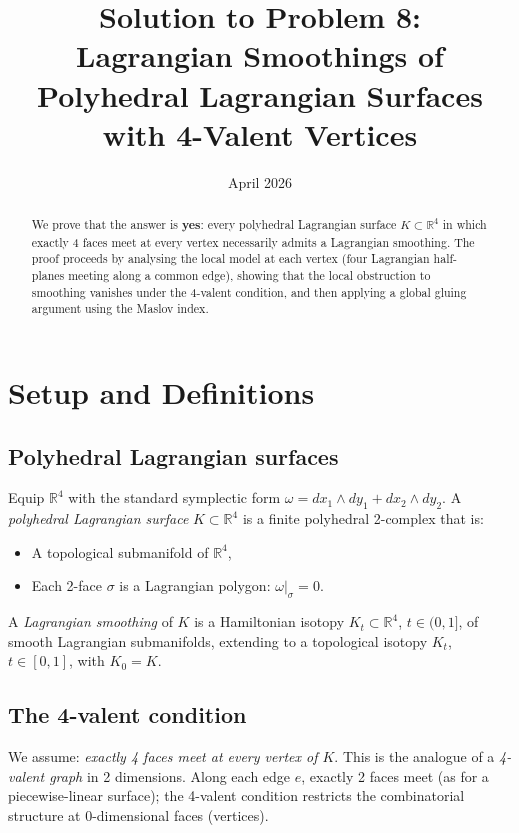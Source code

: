 \documentclass[12pt]{article}
\title{Solution to Problem 8:\\
Lagrangian Smoothings of Polyhedral Lagrangian Surfaces\\
with 4-Valent Vertices}
\author{}
\date{April 2026}
\theoremstyle{definition}
\theoremstyle{remark}
\newcommand{\bR}{\mathbb{R}}
\newcommand{\om}{\omega}
\begin{document}
\maketitle

\begin{abstract}
We prove that the answer is \textbf{yes}: every polyhedral Lagrangian surface
$K\subset\bR^4$ in which exactly 4 faces meet at every vertex necessarily
admits a Lagrangian smoothing.  The proof proceeds by analysing the local
model at each vertex (four Lagrangian half-planes meeting along a common
edge), showing that the local obstruction to smoothing vanishes under the
4-valent condition, and then applying a global gluing argument using the
Maslov index.
\end{abstract}

\section{Setup and Definitions}

\subsection{Polyhedral Lagrangian surfaces}

Equip $\bR^4$ with the standard symplectic form $\om = dx_1\wedge dy_1 +
dx_2\wedge dy_2$.  A \emph{polyhedral Lagrangian surface} $K\subset\bR^4$
is a finite polyhedral 2-complex that is:
\begin{itemize}
\item A topological submanifold of $\bR^4$,
\item Each 2-face $\sigma$ is a Lagrangian polygon: $\om|_\sigma = 0$.
\end{itemize}

A \emph{Lagrangian smoothing} of $K$ is a Hamiltonian isotopy
$K_t\subset\bR^4$, $t\in(0,1]$, of smooth Lagrangian submanifolds,
extending to a topological isotopy $K_t$, $t\in[0,1]$, with $K_0 = K$.

\subsection{The 4-valent condition}

We assume: \emph{exactly 4 faces meet at every vertex of $K$}.
This is the analogue of a \emph{4-valent graph} in 2 dimensions.
Along each edge $e$, exactly 2 faces meet (as for a piecewise-linear
surface); the 4-valent condition restricts the combinatorial structure at
0-dimensional faces (vertices).
\end{document}
